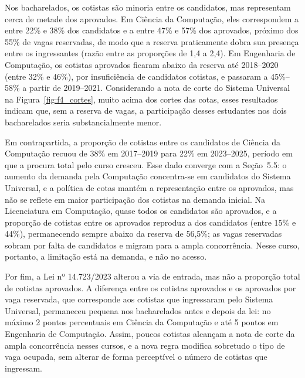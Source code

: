 Nos bacharelados, os cotistas são minoria entre os candidatos, mas representam cerca de metade dos aprovados. Em Ciência da Computação, eles correspondem a entre 22\% e 38\% dos candidatos e a entre 47\% e 57\% dos aprovados, próximo dos 55\% de vagas reservadas, de modo que a reserva praticamente dobra sua presença entre os ingressantes (razão entre as proporções de 1,4 a 2,4). Em Engenharia de Computação, os cotistas aprovados ficaram abaixo da reserva até 2018--2020 (entre 32\% e 46\%), por insuficiência de candidatos cotistas, e passaram a 45\%--58\% a partir de 2019--2021. Considerando a nota de corte do Sistema Universal na Figura~\ref{fig:f4_cortes}, muito acima dos cortes das cotas, esses resultados indicam que, sem a reserva de vagas, a participação desses estudantes nos dois bacharelados seria substancialmente menor.

Em contrapartida, a proporção de cotistas entre os candidatos de Ciência da Computação recuou de 38\% em 2017--2019 para 22\% em 2023--2025, período em que a procura total pelo curso cresceu. Esse dado converge com a Seção~5.5: o aumento da demanda pela Computação concentra-se em candidatos do Sistema Universal, e a política de cotas mantém a representação entre os aprovados, mas não se reflete em maior participação dos cotistas na demanda inicial. Na Licenciatura em Computação, quase todos os candidatos são aprovados, e a proporção de cotistas entre os aprovados reproduz a dos candidatos (entre 15\% e 44\%), permanecendo sempre abaixo da reserva de 56,5\%; as vagas reservadas sobram por falta de candidatos e migram para a ampla concorrência. Nesse curso, portanto, a limitação está na demanda, e não no acesso.

Por fim, a Lei nº 14.723/2023 alterou a via de entrada, mas não a proporção total de cotistas aprovados. A diferença entre os cotistas aprovados e os aprovados por vaga reservada, que corresponde aos cotistas que ingressaram pelo Sistema Universal, permaneceu pequena nos bacharelados antes e depois da lei: no máximo 2 pontos percentuais em Ciência da Computação e até 5 pontos em Engenharia de Computação. Assim, poucos cotistas alcançam a nota de corte da ampla concorrência nesses cursos, e a nova regra modifica sobretudo o tipo de vaga ocupada, sem alterar de forma perceptível o número de cotistas que ingressam.
